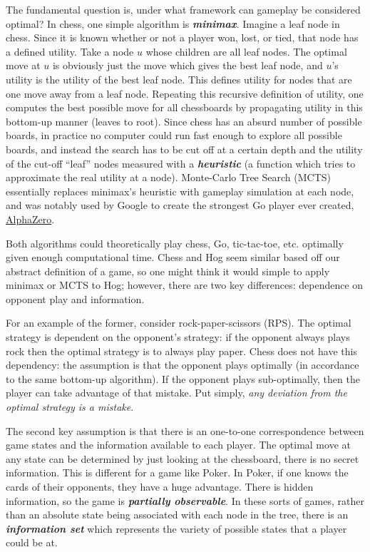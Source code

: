 \documentclass[11pt, oneside]{article}
\newcommand{\emphasis}[1]{\textbf{\textit{#1}}}
\begin{document}
The fundamental question is, under what framework can gameplay be considered optimal?
In chess, one simple algorithm is \emphasis{minimax}. Imagine a leaf node in chess.
Since it is known whether or not a player won, lost, or tied, that node
has a defined utility. Take a node \( u \) whose children are all leaf nodes.
The optimal move at \( u \) is obviously just the move which gives the best
leaf node, and \( u \)'s utility is the utility of the best leaf node.
This defines utility for nodes that are one move away from a leaf node.
Repeating this recursive definition of utility, one computes the 
best possible move for all chessboards by propagating utility 
in this bottom-up manner (leaves to root). 
Since chess has an absurd number of possible boards,
in practice no computer could run fast enough to explore all possible boards,
and instead the search has to be cut off at a certain depth 
and the utility of the cut-off ``leaf'' nodes measured with a \emphasis{heuristic}
(a function which tries to approximate the real utility at a node).
Monte-Carlo Tree Search (MCTS) essentially replaces minimax's heuristic with 
gameplay simulation at each node, and was notably used by Google
to create the strongest Go player ever created, 
\href{https://deepmind.com/blog/article/alphazero-shedding-new-light-grand-games-chess-shogi-and-go}{AlphaZero}.

Both algorithms could theoretically play chess, Go, tic-tac-toe,
etc. optimally given enough computational time. 
Chess and Hog seem similar based off our abstract definition of a game,
so one might think it would simple to apply minimax or MCTS to Hog;
however, there are two key differences: dependence on opponent play and information.

For an example of the former, consider rock-paper-scissors (RPS).
The optimal strategy is dependent on the opponent's strategy:
if the opponent always plays rock then 
the optimal strategy is to always play paper.
Chess does not have this dependency: the assumption is that the opponent 
plays optimally (in accordance to the same bottom-up algorithm).
If the opponent plays sub-optimally, 
then the player can take advantage of that mistake. 
Put simply, \textit{any deviation from the optimal strategy is a mistake}.

The second key assumption is that there is 
an one-to-one correspondence between game states 
and the information available to each player. 
The optimal move at any state can be determined by just looking 
at the chessboard, there is no secret information.
This is different for a game like Poker.
In Poker, if one knows the cards of their opponents, they have a huge advantage.
There is hidden information, so the game is \emphasis{partially observable}.
In these sorts of games, rather than an absolute state being associated with 
each node in the tree, there is an \emphasis{information set}
which represents the variety of possible states that a player could be at.
\end{document}
